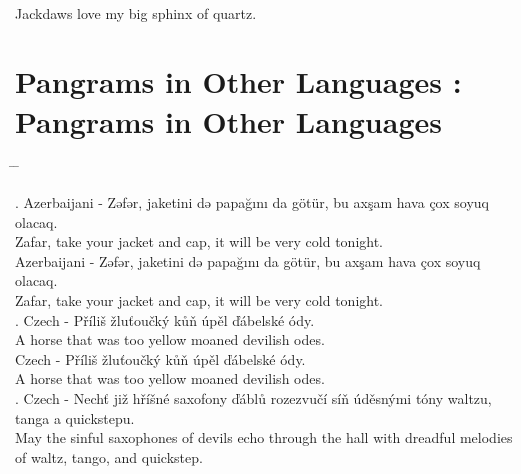 \documentclass{article}
\begin{document}
 \\
\hspace{2em} Jackdaws love my big sphinx of quartz. \medskip \\

\pagebreak

\section*{\frakfamily Pangrams in Other Languages \normalfont: Pangrams in Other Languages}

\begin{tabbing}
\hspace{4em} \= \hspace{6em} \= \kill %

\> {. Azerbaijani - Zəfər, jaketini də papağını da götür, bu axşam hava çox soyuq olacaq.} \\
\> \hspace{2em} {\frakfamily Zafar, take your jacket and cap, it will be very cold tonight.} \medskip \\

 Azerbaijani - Zəfər, jaketini də papağını da götür, bu axşam hava çox soyuq olacaq. \\
\> \hspace{2em} Zafar, take your jacket and cap, it will be very cold tonight. \medskip \\

\> {. Czech - Příliš žluťoučký kůň úpěl ďábelské ódy.} \\
\> \hspace{2em} {\frakfamily A horse that was too yellow moaned devilish odes.} \medskip \\

 Czech - Příliš žluťoučký kůň úpěl ďábelské ódy. \\
\> \hspace{2em} A horse that was too yellow moaned devilish odes. \medskip \\

\> {. Czech - Nechť již hříšné saxofony ďáblů rozezvučí síň úděsnými tóny waltzu, tanga a quickstepu.} \\
\> \hspace{2em} {\frakfamily May the sinful saxophones of devils echo through the hall with dreadful melodies of waltz, tango, and quickstep.} \medskip \\


\end{tabbing}
\end{document}
